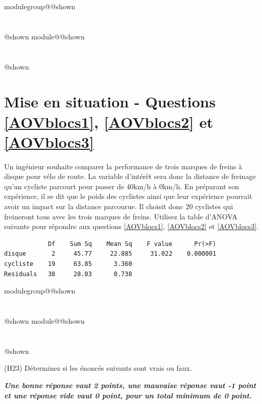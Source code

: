 \documentclass{Evaluation}
\makeatletter
\newcommand{\currentmodulekey}{}
\newcommand{\currentmoduletitle}{}
\newcommand{\currentgroupkey}{}
\newcommand{\currentgrouptitle}{}
\newcommand{\showmoduleifneeded}{%
  \ifx\currentgroupkey\empty\else
    \expandafter\ifx\csname modulegroup@\currentgroupkey @shown\endcsname\relax
      \section*{\currentgrouptitle}%
      \expandafter\gdef\csname modulegroup@\currentgroupkey @shown\endcsname{1}%
    \fi
  \fi
  \expandafter\ifx\csname module@\currentmodulekey @shown\endcsname\relax
    \section*{\currentmoduletitle}%
    \expandafter\gdef\csname module@\currentmodulekey @shown\endcsname{1}%
  \fi
}
\newenvironment{H23}{\showmoduleifneeded}{}
\makeatother
\begin{document}
\begin{questions}
\begin{H23}
\section*{Mise en situation - Questions \ref{AOVblocs1}, \ref{AOVblocs2} et \ref{AOVblocs3}}
Un ingénieur souhaite comparer la performance de trois marques de freins à disque pour vélo de route. La variable d'intérêt sera donc la distance de freinage qu'un cycliste parcourt pour passer de 40km/h à 0km/h. En préparant son expérience, il se dit que le poids des cyclistes ainsi que leur expérience pourrait avoir un impact sur la distance parcourue. Il choisit donc 20 cyclistes qui freineront tous avec les trois marques de freins. Utilisez la table d'ANOVA suivante pour répondre aux questions \ref{AOVblocs1}, \ref{AOVblocs2} et \ref{AOVblocs3}.
\begin{verbatim}
            Df    Sum Sq    Mean Sq    F value      Pr(>F)    
disque       2     45.77     22.885     31.022    0.000001
cycliste    19     63.85      3.360    
Residuals   38     28.03      0.738      
\end{verbatim}
\end{H23}

\begin{H23}
\question
(H23) Déterminez si les énoncés suivants sont vrais ou faux.

\textbf{\textit{Une bonne réponse vaut 2 points, une mauvaise réponse vaut -1 point et une réponse vide vaut 0 point, pour un total minimum de 0 point.}}
\smallskip

\end{H23}
\end{questions}
\end{document}
